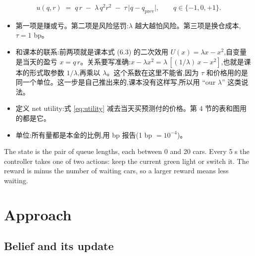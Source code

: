 \documentclass{article}
\newenvironment{pts}{\begin{itemize}[nosep,leftmargin=1.15em,topsep=1pt]}{\end{itemize}}
\newcommand{\qprev}{q_{\mathrm{prev}}}
\begin{document}
\begin{equation}
u(q, r) \;=\; q\,r \;-\; \lambda\,q^{2} r^{2} \;-\; \tau\,\lvert q - \qprev \rvert ,
\qquad q \in \{-1, 0, +1\}.
\label{eq:utility}
\end{equation}

\begin{note}[第 3 段,约 80 词:逐项解释式 (1)]
\begin{pts}
\item 第一项是赚或亏。第二项是风险惩罚:$\lambda$ 越大越怕风险。第三项是换仓成本,$\tau = 1$ bp。
\item 和课本的联系:前两项就是课本式 (6.3) 的二次效用 $U(x)=\lambda x - x^{2}$,自变量是当天的盈亏 $x = q\,r$。关系要写准确:$x - \lambda x^{2} = \lambda\,[(1/\lambda)\,x - x^{2}]$,也就是课本的形式取参数 $1/\lambda$,再乘以 $\lambda$。这个系数在这里不能省,因为 $\tau$ 和价格用的是同一个单位。这一步是自己推出来的,课本没有这样写,所以用 ``our $\lambda$'' 这类说法。
\item 定义 net utility:式 \eqref{eq:utility} 减去当天买预测付的价格。第 4 节的表和图用的都是它。
\item 单位:所有量都是本金的比例,用 bp 报告(1 bp $= 10^{-4}$)。
\end{pts}
\end{note}

\begin{model}
The state is the pair of queue lengths, each between 0 and 20 cars. Every 5 s the controller takes one of two actions: keep the current green light or switch it. The reward is minus the number of waiting cars, so a larger reward means less waiting.
\end{model}

\section{Approach}

\subsection{Belief and its update}
\end{document}
